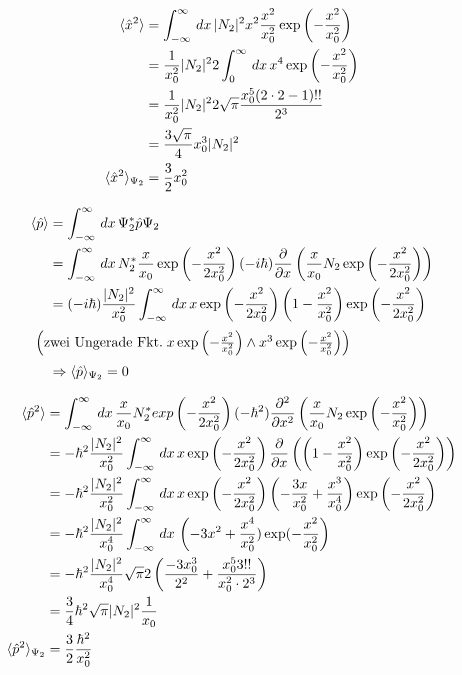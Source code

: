 \begin{align}
    \langle\hat x ^2\rangle &= \int_{-\infty}^{\infty}\,dx\, \lvert N_2\rvert^2 x^2 \frac{x^2}{x_0^2} \exp\left(-\frac{x^2}{x_0^2}\right)\\
    &=\frac{1}{x_0^2} \lvert N_2\rvert^2 2 \int_0^{\infty}\,dx\, x^4 \exp\left(-\frac{x^2}{x_0^2}\right) \nonumber\\
    &=\frac{1}{x_0^2} \lvert N_2\rvert^2 2\sqrt{\pi} \frac{x_0^5(2\cdot2-1)!!}{2^3} \nonumber\\
    &=\frac{3\sqrt{\pi}}{4}x_0^3 \lvert N_2\rvert^2 \nonumber\\
    \langle\hat x ^2\rangle_{\Psi _2}&= \frac{3}{2} x_0^2
\end{align}

\begin{align}
    \langle\hat p \rangle &= \int_{-\infty}^{\infty}\,dx\, \Psi _2^*\hat p \Psi _2\\
    &=\int_{-\infty}^{\infty}\,dx\, N_2^* \frac{x}{x_0} \exp\left(-\frac{x^2}{2x_0^2}\right) (-i\hbar) \frac{\partial}{\partial x}\left(\frac{x}{x_0} N_2 \exp \left(-\frac{x^2}{2x_0^2}\right)\right) \nonumber\\
    &=(-i\hbar) \frac{\lvert N_2\rvert^2}{x_0^2} \int_{-\infty}^{\infty} \,dx\,x\exp\left(-\frac{x^2}{2x_0^2}\right) \left(1-\frac{x^2}{x_0^2}\right)\exp\left(-\frac{x^2}{2x_0^2}\right) \nonumber\\
    \intertext{
        $\left(\text{zwei Ungerade Fkt.}\; x \exp\left(-\frac{x^2}{x_0^2} \right) \wedge x^3 \exp\left(-\frac{x^2}{x_0^2} \right) \right)$
    }
    &\Rightarrow \langle\hat p \rangle_{\Psi _2}=0
\end{align}

\begin{align}
    \langle\hat p ^2\rangle &= \int_{-\infty}^{\infty}\,dx\, \frac{x}{x_0} N_2^* exp\left(-\frac{x^2}{2x_0^2}\right) (-\hbar^2) \frac{\partial ^2}{\partial x^2}\left(\frac{x}{x_0} N_2 \exp\left(-\frac{x^2}{x_0^2}\right) \right)\\
    &= - \hbar ^2 \frac{\lvert N_2\rvert^2}{x_0^2} \int_{-\infty}^{\infty}\,dx\, x \exp\left(-\frac{x^2}{2x_0^2}\right)\frac{\partial}{\partial x}\left(\left(1-\frac{x^2}{x_0^2}\right)\exp\left(-\frac{x^2}{2x_0^2}\right) \right) \nonumber\\
    &= - \hbar ^2 \frac{\lvert N_2\rvert^2}{x_0^2} \int_{-\infty}^{\infty}\,dx\, x \exp\left(-\frac{x^2}{2x_0^2}\right)\left(\--\frac{3x}{x_0^2}+\frac{x^3}{x_0^4} \right) \exp\left(-\frac{x^2}{2x_0^2}\right) \nonumber\\
    &= - \hbar^2 \frac{\lvert N_2\rvert^2}{x_0^4} \int_{-\infty}^{\infty}\,dx\, \left(-3x^2+\frac{x^4}{x_0^2})\exp(-\frac{x^2}{x_0^2}\right) \nonumber\\
    &= - \hbar^2 \frac{\lvert N_2\rvert^2}{x_0^4} \sqrt{\pi} 2\left(\frac{-3x_0^3}{2^2}+\frac{x_0^5 3!!}{x_0^2\cdot 2^3}\right)\nonumber\\
    &= \frac{3}{4} \hbar^2 \sqrt{\pi} \lvert N_2\rvert^2 \frac{1}{x_0} \nonumber\\
    \langle\hat p ^2 \rangle_{\Psi _2}&=\frac{3}{2} \frac{\hbar ^2}{x_0^2}
\end{align}


